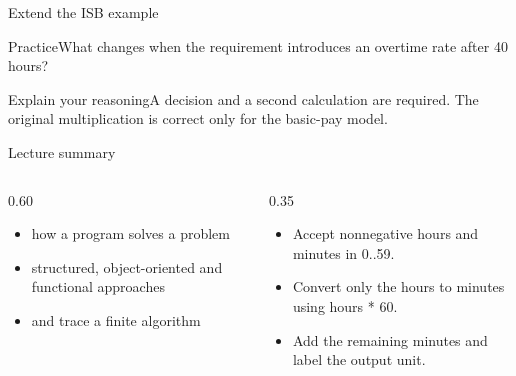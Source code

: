 \documentclass[10pt,aspectratio=169]{beamer}
\begin{document}
\begin{frame}[fragile,t]{Extend the ISB example}
\begin{alertblock}{Practice}What changes when the requirement introduces an overtime rate after 40 hours?\end{alertblock}\vspace{3mm}\begin{exampleblock}{Explain your reasoning}A decision and a second calculation are required. The original multiplication is correct only for the basic{-}pay model.\end{exampleblock}
\end{frame}
\begin{frame}[fragile,t]{Lecture summary}
\begin{columns}[T,onlytextwidth]\begin{column}{0.60\textwidth}
\begin{itemize}
\item how a program solves a problem
\item structured, object-oriented and functional approaches
\item and trace a finite algorithm
\end{itemize}
\end{column}\begin{column}{0.35\textwidth}\small
\begin{itemize}
\item Accept nonnegative hours and minutes in 0..59.
\item Convert only the hours to minutes using hours * 60.
\item Add the remaining minutes and label the output unit.
\end{itemize}
\end{column}\end{columns}
\end{frame}
\end{document}
